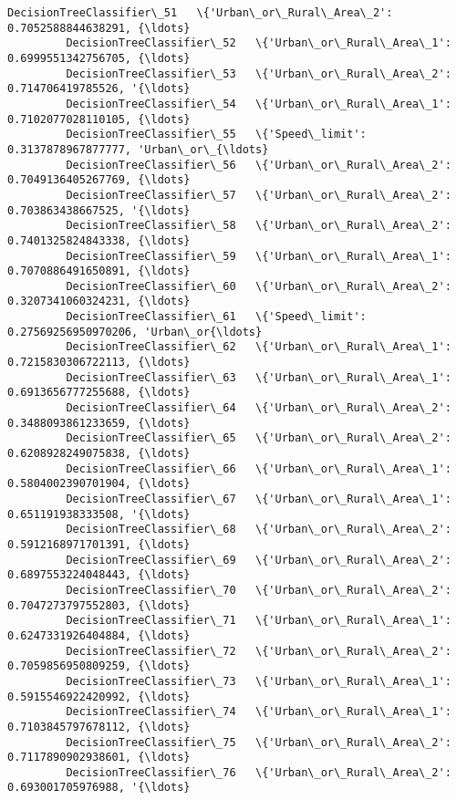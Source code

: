 \documentclass[11pt]{article}
\begin{document}
\begin{Verbatim}[commandchars=\\\{\}]
         DecisionTreeClassifier\_51   \{'Urban\_or\_Rural\_Area\_2': 0.7052588844638291, {\ldots}   
         DecisionTreeClassifier\_52   \{'Urban\_or\_Rural\_Area\_1': 0.6999551342756705, {\ldots}   
         DecisionTreeClassifier\_53   \{'Urban\_or\_Rural\_Area\_2': 0.714706419785526, '{\ldots}   
         DecisionTreeClassifier\_54   \{'Urban\_or\_Rural\_Area\_1': 0.7102077028110105, {\ldots}   
         DecisionTreeClassifier\_55   \{'Speed\_limit': 0.3137878967877777, 'Urban\_or\_{\ldots}   
         DecisionTreeClassifier\_56   \{'Urban\_or\_Rural\_Area\_2': 0.7049136405267769, {\ldots}   
         DecisionTreeClassifier\_57   \{'Urban\_or\_Rural\_Area\_2': 0.703863438667525, '{\ldots}   
         DecisionTreeClassifier\_58   \{'Urban\_or\_Rural\_Area\_2': 0.7401325824843338, {\ldots}   
         DecisionTreeClassifier\_59   \{'Urban\_or\_Rural\_Area\_1': 0.7070886491650891, {\ldots}   
         DecisionTreeClassifier\_60   \{'Urban\_or\_Rural\_Area\_2': 0.3207341060324231, {\ldots}   
         DecisionTreeClassifier\_61   \{'Speed\_limit': 0.27569256950970206, 'Urban\_or{\ldots}   
         DecisionTreeClassifier\_62   \{'Urban\_or\_Rural\_Area\_1': 0.7215830306722113, {\ldots}   
         DecisionTreeClassifier\_63   \{'Urban\_or\_Rural\_Area\_1': 0.6913656777255688, {\ldots}   
         DecisionTreeClassifier\_64   \{'Urban\_or\_Rural\_Area\_2': 0.3488093861233659, {\ldots}   
         DecisionTreeClassifier\_65   \{'Urban\_or\_Rural\_Area\_2': 0.6208928249075838, {\ldots}   
         DecisionTreeClassifier\_66   \{'Urban\_or\_Rural\_Area\_1': 0.5804002390701904, {\ldots}   
         DecisionTreeClassifier\_67   \{'Urban\_or\_Rural\_Area\_1': 0.651191938333508, '{\ldots}   
         DecisionTreeClassifier\_68   \{'Urban\_or\_Rural\_Area\_2': 0.5912168971701391, {\ldots}   
         DecisionTreeClassifier\_69   \{'Urban\_or\_Rural\_Area\_2': 0.6897553224048443, {\ldots}   
         DecisionTreeClassifier\_70   \{'Urban\_or\_Rural\_Area\_2': 0.7047273797552803, {\ldots}   
         DecisionTreeClassifier\_71   \{'Urban\_or\_Rural\_Area\_1': 0.6247331926404884, {\ldots}   
         DecisionTreeClassifier\_72   \{'Urban\_or\_Rural\_Area\_2': 0.7059856950809259, {\ldots}   
         DecisionTreeClassifier\_73   \{'Urban\_or\_Rural\_Area\_1': 0.5915546922420992, {\ldots}   
         DecisionTreeClassifier\_74   \{'Urban\_or\_Rural\_Area\_1': 0.7103845797678112, {\ldots}   
         DecisionTreeClassifier\_75   \{'Urban\_or\_Rural\_Area\_2': 0.7117890902938601, {\ldots}   
         DecisionTreeClassifier\_76   \{'Urban\_or\_Rural\_Area\_2': 0.693001705976988, '{\ldots}   

\end{Verbatim}
\end{document}
